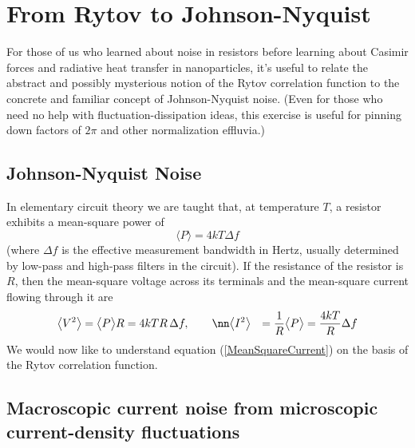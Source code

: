 \documentclass[letterpaper]{article}
\begin{document}
\newpage
\section{From Rytov to Johnson-Nyquist}
\label{RytovToJohnson}

For those of us who learned about noise in resistors
before learning about Casimir forces and radiative heat transfer
in nanoparticles,
it's useful to relate the abstract and possibly mysterious 
notion of the Rytov correlation function to the concrete and 
familiar concept of Johnson-Nyquist noise.
(Even for those who need no help with fluctuation-dissipation 
ideas, this exercise is useful for pinning down factors of $2\pi$ and
other normalization effluvia.)

\subsection*{Johnson-Nyquist Noise}

In elementary circuit theory we are taught that, at temperature
$T$, a resistor exhibits a mean-square power of 
$$ \big\langle P \big\rangle = 4 kT \Delta f$$
(where $\Delta f$ is the effective measurement bandwidth in Hertz,
usually determined by low-pass and high-pass filters in the circuit).
If the resistance of the resistor is $R$, then the mean-square voltage 
across its terminals and the mean-square current flowing through it are
\begin{align}
 \big \langle V^2 \big\rangle 
 &= \big\langle P \big \rangle R = 4k T R\, \Delta f, \qquad 
\nn
 \big \langle I^2 \big\rangle 
 &= \frac{1}{R} \big\langle P \big \rangle 
  = \frac{4k T}{R} \Delta f
\label{MeanSquareCurrent}
\end{align}
We would now like to understand equation (\ref{MeanSquareCurrent})
on the basis of the Rytov correlation function.

\subsection*{Macroscopic current noise from microscopic current-density 
             fluctuations}
\end{document}
